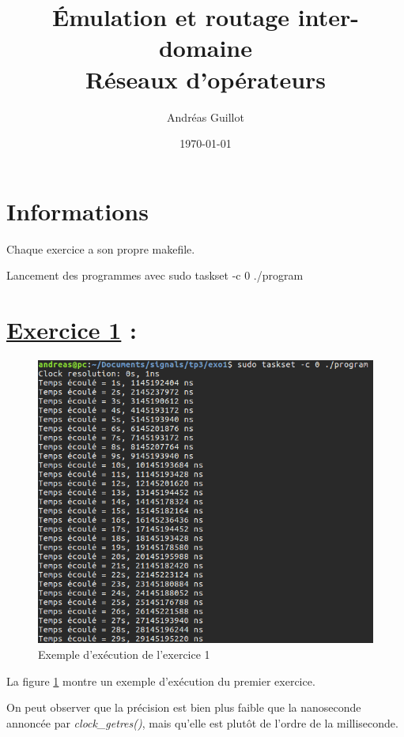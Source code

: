 \documentclass{article}
\title{Émulation et routage inter-domaine \\Réseaux d'opérateurs}
\author{Andréas Guillot}
\date{\today}
\begin{document}
\maketitle


\section*{Informations}

Chaque exercice a son propre makefile.

Lancement des programmes avec sudo taskset -c 0 ./program

\section*{\underline{Exercice 1} :}

\begin{figure}
  \includegraphics[width=\linewidth]{exo1.png}
  \caption{Exemple d'exécution de l'exercice 1}
  \label{fig:exo1}
\end{figure}

La figure \ref{fig:exo1} montre un exemple d'exécution du premier exercice.

On peut observer que la précision est bien plus faible que la nanoseconde annoncée par \textit{clock\_getres()}, mais qu'elle est plutôt de l'ordre de la milliseconde.
\end{document}
